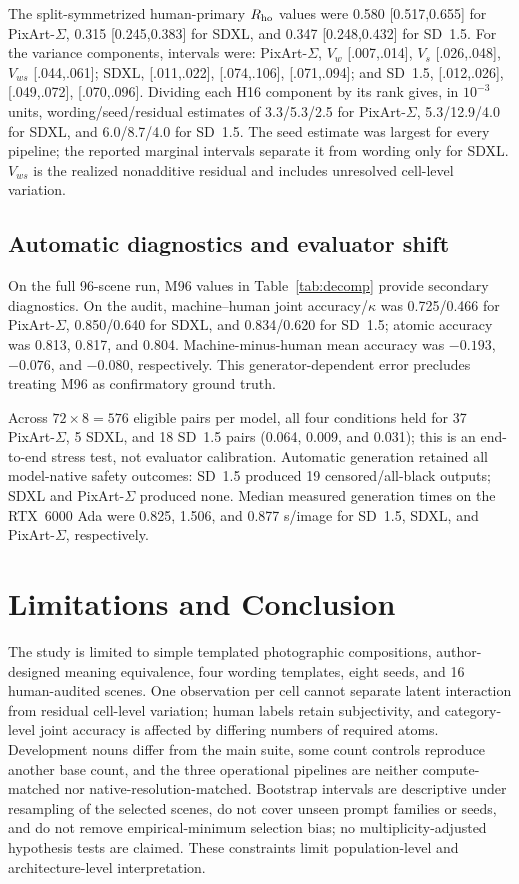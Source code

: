 \documentclass[10pt,letterpaper]{article}
\begin{document}
The split-symmetrized human-primary $R_{\rm ho}$ values were 0.580 [0.517,0.655] for PixArt-$\Sigma$, 0.315 [0.245,0.383] for SDXL, and 0.347 [0.248,0.432] for SD~1.5. For the variance components, intervals were: PixArt-$\Sigma$, $V_w$ [.007,.014], $V_s$ [.026,.048], $V_{ws}$ [.044,.061]; SDXL, [.011,.022], [.074,.106], [.071,.094]; and SD~1.5, [.012,.026], [.049,.072], [.070,.096]. Dividing each H16 component by its rank gives, in $10^{-3}$ units, wording/seed/residual estimates of 3.3/5.3/2.5 for PixArt-$\Sigma$, 5.3/12.9/4.0 for SDXL, and 6.0/8.7/4.0 for SD~1.5. The seed estimate was largest for every pipeline; the reported marginal intervals separate it from wording only for SDXL. $V_{ws}$ is the realized nonadditive residual and includes unresolved cell-level variation.

\subsection{Automatic diagnostics and evaluator shift}
On the full 96-scene run, M96 values in Table~\ref{tab:decomp} provide secondary diagnostics. On the audit, machine--human joint accuracy/$\kappa$ was 0.725/0.466 for PixArt-$\Sigma$, 0.850/0.640 for SDXL, and 0.834/0.620 for SD~1.5; atomic accuracy was 0.813, 0.817, and 0.804. Machine-minus-human mean accuracy was $-0.193$, $-0.076$, and $-0.080$, respectively. This generator-dependent error precludes treating M96 as confirmatory ground truth.

Across $72\times8=576$ eligible pairs per model, all four conditions held for 37 PixArt-$\Sigma$, 5 SDXL, and 18 SD~1.5 pairs (0.064, 0.009, and 0.031); this is an end-to-end stress test, not evaluator calibration. Automatic generation retained all model-native safety outcomes: SD~1.5 produced 19 censored/all-black outputs; SDXL and PixArt-$\Sigma$ produced none. Median measured generation times on the RTX~6000 Ada were 0.825, 1.506, and 0.877 s/image for SD~1.5, SDXL, and PixArt-$\Sigma$, respectively.

\section{Limitations and Conclusion}
The study is limited to simple templated photographic compositions, author-designed meaning equivalence, four wording templates, eight seeds, and 16 human-audited scenes. One observation per cell cannot separate latent interaction from residual cell-level variation; human labels retain subjectivity, and category-level joint accuracy is affected by differing numbers of required atoms. Development nouns differ from the main suite, some count controls reproduce another base count, and the three operational pipelines are neither compute-matched nor native-resolution-matched. Bootstrap intervals are descriptive under resampling of the selected scenes, do not cover unseen prompt families or seeds, and do not remove empirical-minimum selection bias; no multiplicity-adjusted hypothesis tests are claimed. These constraints limit population-level and architecture-level interpretation.
\end{document}

